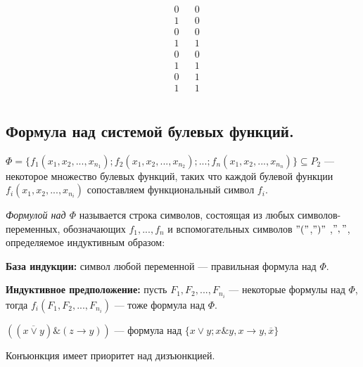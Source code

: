 \begin{enumerate}
$$\begin{array}{rrr|c}
	&
	\begin{array}{r}
	0\\ 1\\ 0\\ 1\\ 0\\ 1\\ 0\\ 1\\
	\end{array}
	&
	\begin{array}{r}
	0\\ 0\\ 0\\ 1\\ 0\\ 1\\ 1\\ 1\\
	\end{array}
	\end{array}
	$$
\end{enumerate}	


\subsection{Формула над системой булевых функций.}
$\Phi=\{f_{1}(x_{1},x_{2},...,x_{n_1});f_{2}(x_{1},x_{2},...,x_{n_2});...;f_{n}(x_{1},x_{2},...,x_{n_n})\}\subseteq P_2$ --- некоторое множество булевых функций, таких что каждой булевой функции $f_{i}(x_{1},x_{2},...,x_{n_i})$ сопоставляем функциональный символ $f_{i}$.
\begin{definition}

	\textit{Формулой над $\Phi$} называется строка символов, состоящая из любых символов-переменных, обозначающих $f_1,...,f_n$ и вспомогательных символов $"("$,$")"$ ,$","$, определяемое индуктивным образом: 

\textbf{База индукции:} символ любой переменной --- правильная формула над $\Phi$.

\textbf{Индуктивное предположение: } пусть $F_1,F_2,...,F_{n_i}$ --- некоторые формулы над $\Phi$, тогда $f_i(F_1,F_2,...,F_{n_i})$ --- тоже формула над $\Phi$.

\end{definition}
\begin{example}
	$((\overline{x\vee y}) \& (z\rightarrow y ))$ --- формула над $\{x \vee y; x \& y, x \rightarrow y, \overline{x} \}$\\
\end{example}
Конъюнкция имеет приоритет над дизъюнкцией.\\

